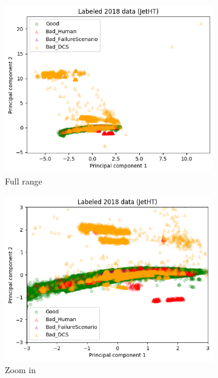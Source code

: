 \begin{figure}[h!]
\centering
    \begin{subfigure}[b]{0.49\linewidth}
        \includegraphics[width=\linewidth]{images/reco/2018/JetHT_label_separate.png}
        \caption{Full range}
    \end{subfigure}
    \begin{subfigure}[b]{0.49\linewidth}
        \includegraphics[width=\linewidth]{images/reco/2018/JetHT_label_separate_short_range.png}
        \caption{Zoom in}
    \end{subfigure}
    \begin{subfigure}[b]{0.49\linewidth}

\end{subfigure}
\end{figure}

